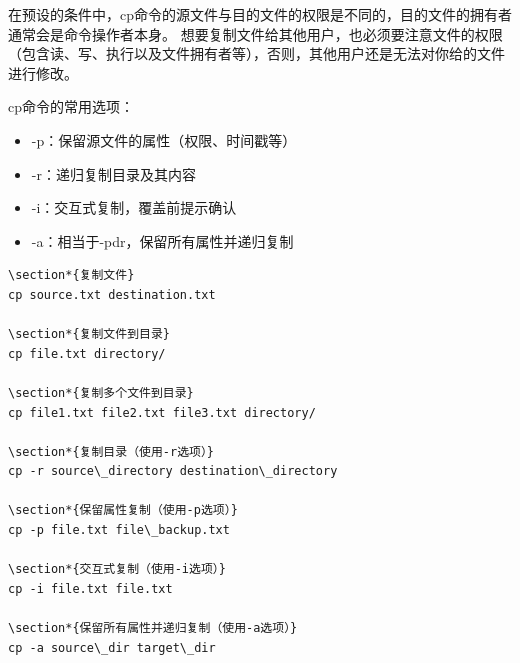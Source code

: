 \documentclass[12pt,UTF8]{ctexbook}
\begin{document}
在预设的条件中，cp命令的源文件与目的文件的权限是不同的，目的文件的拥有者通常会是命令操作者本身。
想要复制文件给其他用户，也必须要注意文件的权限（包含读、写、执行以及文件拥有者等），否则，其他用户还是无法对你给的文件进行修改。

cp命令的常用选项：
\begin{itemize}
    \item -p：保留源文件的属性（权限、时间戳等）
    \item -r：递归复制目录及其内容
    \item -i：交互式复制，覆盖前提示确认
    \item -a：相当于-pdr，保留所有属性并递归复制
\end{itemize}

\begin{verbatim}
\section*{复制文件}
cp source.txt destination.txt

\section*{复制文件到目录}
cp file.txt directory/

\section*{复制多个文件到目录}
cp file1.txt file2.txt file3.txt directory/

\section*{复制目录（使用-r选项）}
cp -r source\_directory destination\_directory

\section*{保留属性复制（使用-p选项）}
cp -p file.txt file\_backup.txt

\section*{交互式复制（使用-i选项）}
cp -i file.txt file.txt

\section*{保留所有属性并递归复制（使用-a选项）}
cp -a source\_dir target\_dir
\end{verbatim}
\end{document}
